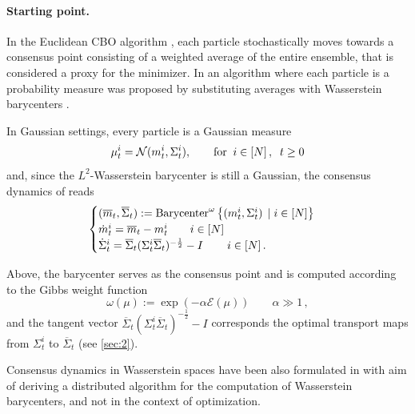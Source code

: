 \documentclass{article}
\theoremstyle{plain}
\theoremstyle{definition}
\theoremstyle{remark}
\newcommand{\E}{\mathcal{E}}
\begin{document}
\paragraph{Starting point.} In the Euclidean CBO algorithm \cite{pinnau2017consensus}, each particle stochastically moves towards a consensus point consisting of a 
weighted average of the entire ensemble, that is considered a proxy for the minimizer. In  \cite{borghi2025wass} an algorithm where each particle is a probability measure was proposed by substituting averages with Wasserstein barycenters \cite{cariler2011bary}. 

In Gaussian settings, every particle is a Gaussian measure
\[
\mu_t^i = \mathcal{N}(m_t^i, \Sigma_t^i), \qquad \textup{for}\;\; i \in [N]\,,\;\; t\geq 0
\]
and, since the $L^2$-Wasserstein barycenter is still a Gaussian, the consensus dynamics of \cite{borghi2025wass}  reads
\begin{equation} \label{eq:bwcbo}
\begin{cases}
(\overline{m}_t, \overline{\Sigma}_t) := \textup{Barycenter}^{\omega}\left\{(m_t^i, \Sigma_t^i)\,\mid i \in [N]  \right \}  \\
\dot{m}_t^i = \overline{m}_t - m_t^i  \qquad i \in [N] \\
\dot{\Sigma}_t^i = \overline{\Sigma}_t(\Sigma_t^i \overline{\Sigma}_t)^{-\frac12} - I\, \qquad i \in [N]\,.
\end{cases}
\end{equation}

Above, the barycenter serves as the consensus point and is computed according to the Gibbs weight function
\begin{equation} \label{eq:weights}
\omega(\mu) := \exp\left(-\alpha \E(\mu) \right)\qquad \alpha \gg 1\,,
\end{equation}
and the tangent vector $\overline{\Sigma}_t(\Sigma_t^i \overline{\Sigma}_t)^{-\frac12} - I$ corresponds the optimal transport maps from $\Sigma_t^i$ to $\overline{\Sigma}_t$ (see \cref{sec:2}). 

Consensus dynamics in Wasserstein spaces have been also formulated in \cite{doucet2014,doucet2021,bullo2023} with aim of deriving a distributed algorithm for the computation of Wasserstein barycenters, and not in the context of optimization.
\end{document}
